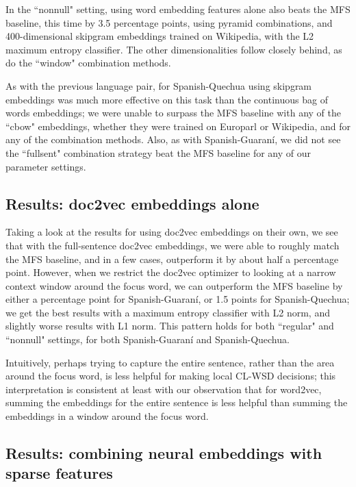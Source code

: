 In the ``nonnull" setting, using word embedding features alone also beats the
MFS baseline, this time by 3.5 percentage points, using pyramid combinations,
and 400-dimensional skipgram embeddings trained on Wikipedia, with the L2
maximum entropy classifier. The other dimensionalities follow closely behind,
as do the ``window" combination methods.

As with the previous language pair, for Spanish-Quechua using skipgram
embeddings was much more effective on this task than the continuous bag of
words embeddings; we were unable to surpass the MFS baseline with any of the
``cbow" embeddings, whether they were trained on Europarl or Wikipedia, and for
any of the combination methods. Also, as with Spanish-Guaraní, we did not see
the ``fullsent" combination strategy beat the MFS baseline for any of our
parameter settings.

\subsection{Results: doc2vec embeddings alone}
Taking a look at the results for using doc2vec embeddings on their own, we see
that with the full-sentence doc2vec embeddings, we were able to roughly match
the MFS baseline, and in a few cases, outperform it by about half a percentage
point. However, when we restrict the doc2vec optimizer to looking at a narrow
context window around the focus word, we can outperform the MFS baseline by
either a percentage point for Spanish-Guaraní, or 1.5 points for
Spanish-Quechua; we get the best results with a maximum entropy classifier with
L2 norm, and slightly worse results with L1 norm. This pattern holds for both
``regular" and ``nonnull" settings, for both Spanish-Guaraní and
Spanish-Quechua.

Intuitively, perhaps trying to capture the entire sentence, rather than the
area around the focus word, is less helpful for making local CL-WSD decisions;
this interpretation is consistent at least with our observation that for
word2vec, summing the embeddings for the entire sentence is less helpful than
summing the embeddings in a window around the focus word.

\subsection{Results: combining neural embeddings with sparse features}

